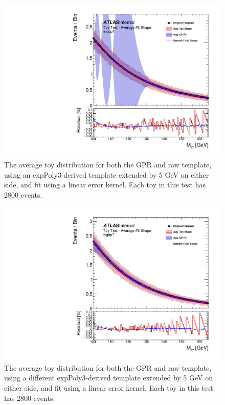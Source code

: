 \begin{figure} 
\begin{center}
  \includegraphics[width=\textwidth]{figures/background/gpr/validation/linear/ToyTest_AvgFitShape_medpT_2800_noSig}   
\caption{The average toy distribution for both the GPR and raw template, using an expPoly3-derived template extended by 5 GeV on either side, and fit using a linear error kernel. Each toy in this test has 2800 events.}
\label{fig:linearkernel_medpt_2800_noSig}
\end{center}
\end{figure}

\begin{figure} 
\begin{center}
  \includegraphics[width=\textwidth]{figures/background/gpr/validation/linear/ToyTest_AvgFitShape_highpT_2800_noSig}   
\caption{The average toy distribution for both the GPR and raw template, using a different expPoly3-derived template extended by 5 GeV on either side, and fit using a linear error kernel. Each toy in this test has 2800 events.}
\label{fig:linearkernel_highpt_2800_noSig}
\end{center}
\end{figure}

